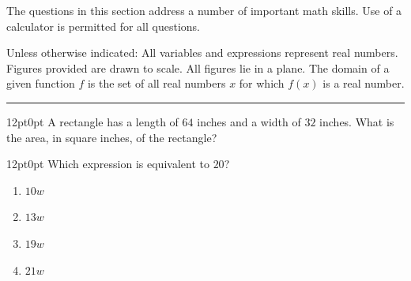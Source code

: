 \documentclass[11pt, twocolumn]{article}
\newcounter{questionnum}
\begin{document}
The questions in this section address a number of important math skills. Use of a calculator is permitted for all questions.

Unless otherwise indicated: All variables and expressions represent real numbers. Figures provided are drawn to scale. All figures lie in a plane. The domain of a given function $f$ is the set of all real numbers $x$ for which $f(x)$ is a real number.
\vspace{8pt}
\hrule
\vspace{8pt}
\twocolumn
\pagestyle{questionpage}

\vspace{6pt}\noindent
\begin{minipage}{\columnwidth}\raggedright
\noindent{}\par\vspace{8pt}
\begin{adjustwidth}{12pt}{0pt}
A rectangle has a length of $64$ inches and a width of $32$ inches. What is the area, in square inches, of the rectangle?
\end{adjustwidth}
\end{minipage}\par

\vspace{6pt}\noindent
\begin{minipage}{\columnwidth}\raggedright
\noindent{}\par\vspace{8pt}
\begin{adjustwidth}{12pt}{0pt}
Which expression is equivalent to $20$?
\begin{enumerate}[label=\Alph*),leftmargin=18pt,topsep=3pt,itemsep=2pt]
  \item $10 w$
  \item $13 w$
  \item $19 w$
  \item $21 w$
\end{enumerate}
\end{adjustwidth}
\end{minipage}\par
\end{document}
